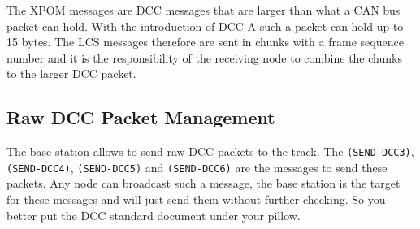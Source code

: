 \begin{table}[ht!]
    \centering 
    \caption{RailCom DCC Packet management}
\end{table}

The XPOM messages are DCC messages that are larger than what a CAN bus packet can hold. With the introduction of DCC-A such a packet can hold up to 15 bytes. The LCS messages therefore are sent in chunks with a frame sequence number and it is the responsibility of the receiving node to combine the chunks to the larger DCC packet.

\subsection{Raw DCC Packet Management}

The base station allows to send raw DCC packets to the track. The \texttt{(SEND-DCC3)}, \texttt{(SEND-DCC4)}, \texttt{(SEND-DCC5)} and \texttt{(SEND-DCC6)} are the messages to send these packets. Any node can broadcast such a message, the base station is the target for these messages and will just send them without further checking. So you better put the DCC standard document under your pillow.

